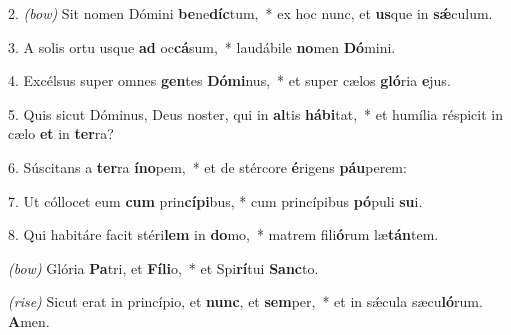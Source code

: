 2. \textit{(bow)} Sit nomen Dómini \textbf{be}ne\textbf{díc}\-tum,~*
	ex hoc nunc, et \textbf{us}que in \textbf{s\'{\ae}}culum.

3. A solis ortu usque \textbf{ad} oc\textbf{cá}sum,~*
	laudábile \textbf{no}men \textbf{Dó}mini.

4. Excélsus super omnes \textbf{gen}tes \textbf{Dó}\textbf{mi}nus,~*
	et super cælos \textbf{gló}ria \textbf{e}jus.

5. Quis sicut Dóminus, Deus noster, qui in \textbf{al}tis \textbf{há}\textbf{bi}tat,~*
	et humília réspicit in cælo \textbf{et} in \textbf{ter}ra?

6. Súscitans a \textbf{ter}ra \textbf{ín}\textbf{o}pem,~*
	et de stércore \textbf{é}rigens \textbf{páu}perem:

7. Ut cóllocet eum \textbf{cum} prin\textbf{cí}\textbf{pi}bus, *
	cum princípibus \textbf{pó}puli \textbf{su}i.

8. Qui habitáre facit stéri\textbf{lem} in \textbf{do}mo,~*
	matrem fili\textbf{ó}rum læ\textbf{tán}tem.

\textit{(bow)} Glória \textbf{Pa}tri, et \textbf{Fí}\textbf{li}o,~*
	et Spi\textbf{rí}tui \textbf{Sanc}to.

\textit{(rise)} Sicut erat in princípio, et \textbf{nunc}, et \textbf{sem}per,~*
	et in s\'{\ae}cula sæcu\textbf{ló}rum. \textbf{A}men.